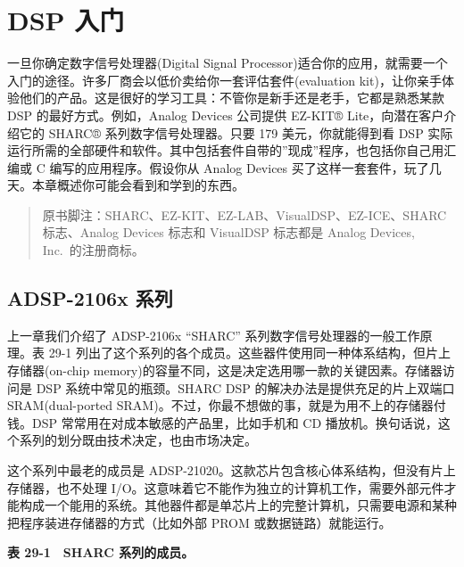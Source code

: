 
\chapter{DSP 入门}\label{ch-29}

一旦你确定数字信号处理器(Digital Signal
Processor)适合你的应用，就需要一个入门的途径。许多厂商会以低价卖给你一套评估套件(evaluation
kit)，让你亲手体验他们的产品。这是很好的学习工具：不管你是新手还是老手，它都是熟悉某款
DSP 的最好方式。例如，Analog Devices 公司提供 EZ-KIT®
Lite，向潜在客户介绍它的 SHARC® 系列数字信号处理器。只要 179
美元，你就能得到看 DSP
实际运行所需的全部硬件和软件。其中包括套件自带的''现成''程序，也包括你自己用汇编或
C 编写的应用程序。假设你从 Analog Devices
买了这样一套套件，玩了几天。本章概述你可能会看到和学到的东西。

\begin{quote}
原书脚注：SHARC、EZ-KIT、EZ-LAB、VisualDSP、EZ-ICE、SHARC 标志、Analog
Devices 标志和 VisualDSP 标志都是 Analog Devices, Inc.~的注册商标。
\end{quote}

\section{ADSP-2106x 系列}

上一章我们介绍了 ADSP-2106x ``SHARC''
系列数字信号处理器的一般工作原理。表 29-1
列出了这个系列的各个成员。这些器件使用同一种体系结构，但片上存储器(on-chip
memory)的容量不同，这是决定选用哪一款的关键因素。存储器访问是 DSP
系统中常见的瓶颈。SHARC DSP 的解决办法是提供充足的片上双端口
SRAM(dual-ported
SRAM)。不过，你最不想做的事，就是为用不上的存储器付钱。DSP
常常用在对成本敏感的产品里，比如手机和 CD
播放机。换句话说，这个系列的划分既由技术决定，也由市场决定。

这个系列中最老的成员是
ADSP-21020。这款芯片包含核心体系结构，但没有片上存储器，也不处理
I/O。这意味着它不能作为独立的计算机工作，需要外部元件才能构成一个能用的系统。其他器件都是单芯片上的完整计算机，只需要电源和某种把程序装进存储器的方式（比如外部
PROM 或数据链路）就能运行。

\textbf{表 29-1　SHARC 系列的成员。}

